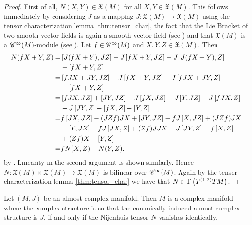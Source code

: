 \begin{proof}
First of all, $N(X,Y) \in \mathfrak{X}(M)$ for all $X,Y \in \mathfrak{X}(M)$. This follows immediately by considering $J$ as a mapping $J : \mathfrak{X}(M) \to \mathfrak{X}(M)$ using the tensor characterization lemma \ref{thm:tensor_char}, the fact that the Lie Bracket of two smooth vector fields is again a smooth vector field (see \cite[186]{lee:smooth_manifolds:2013}) and that $\mathfrak{X}(M)$ is a $\mathscr{C}^\infty(M)$-module (see \cite[177]{lee:smooth_manifolds:2013}). Let $f \in \mathscr{C}^\infty(M)$ and $X,Y,Z \in \mathfrak{X}(M)$. Then
\begin{align*}
N(fX + Y,Z) =& \sbr[0]{J(fX + Y),JZ} - J\sbr[0]{fX + Y,JZ} - J\sbr[0]{J(fX + Y),Z}\\
 &- \sbr[0]{fX + Y,Z}\\
=& \sbr[0]{fJX + JY,JZ} - J\sbr[0]{fX + Y,JZ} - J\sbr[0]{fJX + JY,Z}\\
& - \sbr[0]{fX + Y,Z}\\
=& \sbr[0]{fJX,JZ} + \sbr[0]{JY,JZ} - J\sbr[0]{fX,JZ} - J\sbr[0]{Y,JZ} - J\sbr[0]{fJX,Z}\\
& -J\sbr[0]{JY,Z} - \sbr[0]{fX,Z} - \sbr[0]{Y,Z}\\
=& f\sbr[0]{JX,JZ} - (JZf)JX + \sbr[0]{JY,JZ} - fJ\sbr[0]{X,JZ} + (JZf)JX\\
& - \sbr[0]{Y,JZ} - fJ\sbr[0]{JX,Z} + (Zf)JJX - J\sbr[0]{JY,Z} - f\sbr[0]{X,Z}\\
& + (Zf)X - \sbr[0]{Y,Z}\\
=& fN(X,Z) + N(Y,Z).
\end{align*}
\noindent by \cite[187--188]{lee:smooth_manifolds:2013}. Linearity in the second argument is shown similarly. Hence $N : \mathfrak{X}(M) \times \mathfrak{X}(M) \to \mathfrak{X}(M)$ is bilinear over $\mathscr{C}^\infty(M)$. Again by the tensor characterization lemma \ref{thm:tensor_char} we have that $N \in \Gamma\del[1]{T^{(1,2)}TM}$.
\end{proof}

\begin{theorem}
Let $(M,J)$ be an almost complex manifold. Then $M$ is a complex manifold, where the complex structure is so that the canonically induced almost complex structure is $J$, if and only if the Nijenhuis tensor $N$ vanishes identically.
\end{theorem}

